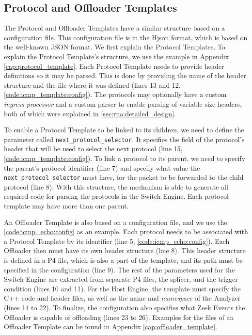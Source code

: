 \subsection{Protocol and Offloader Templates}

The Protocol and Offloader Templates have a similar structure based on a configuration file. This configuration file is in the Hjson \cite{Hjson} format, which is based on the well-known JSON format. We first explain the Protocol Templates. To explain the Protocol Template's structure, we use the example in Appendix \ref{cap:protocol_template}. Each Protocol Template needs to provide header definitions so it may be parsed. This is done by providing the name of the header structure and the file where it was defined (lines 13 and 12, \autoref{code:icmp_template:config}). The protocols may optionally have a custom \textit{ingress processor} and a custom parser to enable parsing of variable-size headers, both of which were explained in \autoref{sec:rna:detailed_design}.

To enable a Protocol Template to be linked to its children, we need to define the parameter called \texttt{next\_protocol\_selector}. It specifies the field of the protocol's header that will be used to select the next protocol (line 15, \autoref{code:icmp_template:config}). To link a protocol to its parent, we need to specify the parent's protocol identifier (line 7) and specify what value the \texttt{next\_protocol\_selector} must have, for the packet to be forwarded to the child protocol (line 8). With this structure, the mechanism is able to generate all required code for parsing the protocols in the Switch Engine. Each protocol template may have more than one parent.

An Offloader Template is also based on a configuration file, and we use the \autoref{code:icmp_echo:config} as an example. Each protocol needs to be associated with a Protocol Template by its identifier (line 5, \autoref{code:icmp_echo:config}). Each Offloader then must have its own header structure (line 8). This header structure is defined in a P4 file, which is also a part of the template, and its path must be specified in the configuration (line 9). The rest of the parameters used for the Switch Engine are extracted from separate P4 files, the splicer, and the trigger condition (lines 10 and 11). For the Host Engine, the template must specify the C++ code and header files, as well as the name and \textit{namespace} of the Analyzer (lines 14 to 22). To finalize, the configuration also specifies what Zeek Events the Offloader is capable of offloading (lines 23 to 26). Examples for the files of an Offloader Template can be found in Appendix \ref{cap:offloader_template}.

